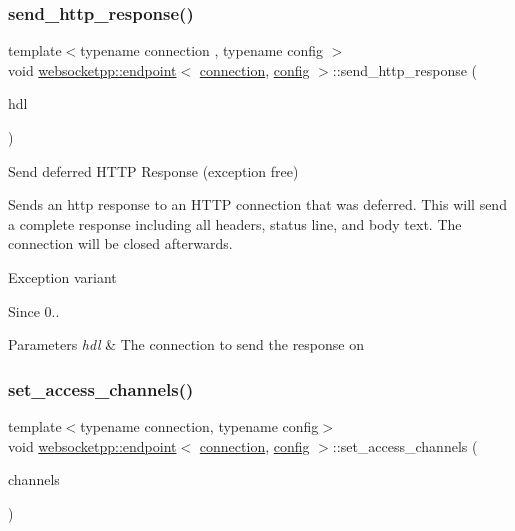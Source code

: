 \subsubsection{\texorpdfstring{send\+\_\+http\+\_\+response()}{send\_http\_response()}\hspace{0.1cm}{\footnotesize\ttfamily [2/2]}}
{\footnotesize\ttfamily template$<$typename connection , typename config $>$ \\
void \mbox{\hyperlink{classwebsocketpp_1_1endpoint}{websocketpp\+::endpoint}}$<$ \mbox{\hyperlink{classwebsocketpp_1_1connection}{connection}}, \mbox{\hyperlink{classconfig}{config}} $>$\+::send\+\_\+http\+\_\+response (\begin{DoxyParamCaption}\item[{\mbox{\hyperlink{namespacewebsocketpp_a6b3d26a10ee7229b84b776786332631d}{connection\+\_\+hdl}}}]{hdl }\end{DoxyParamCaption})}



Send deferred H\+T\+TP Response (exception free) 

Sends an http response to an H\+T\+TP connection that was deferred. This will send a complete response including all headers, status line, and body text. The connection will be closed afterwards.

Exception variant

\begin{DoxySince}{Since}
0..
\end{DoxySince}

\begin{DoxyParams}{Parameters}
{\em hdl} & The connection to send the response on \\
\hline
\end{DoxyParams}
\mbox{\label{classwebsocketpp_1_1endpoint_a5d7da609ebd2f797e5e67b6d050ebc59}} 
\subsubsection{\texorpdfstring{set\+\_\+access\+\_\+channels()}{set\_access\_channels()}}
{\footnotesize\ttfamily template$<$typename connection, typename config$>$ \\
void \mbox{\hyperlink{classwebsocketpp_1_1endpoint}{websocketpp\+::endpoint}}$<$ \mbox{\hyperlink{classwebsocketpp_1_1connection}{connection}}, \mbox{\hyperlink{classconfig}{config}} $>$\+::set\+\_\+access\+\_\+channels (\begin{DoxyParamCaption}\item[{log\+::level}]{channels }\end{DoxyParamCaption})\hspace{0.3cm}{\ttfamily [inline]}}



